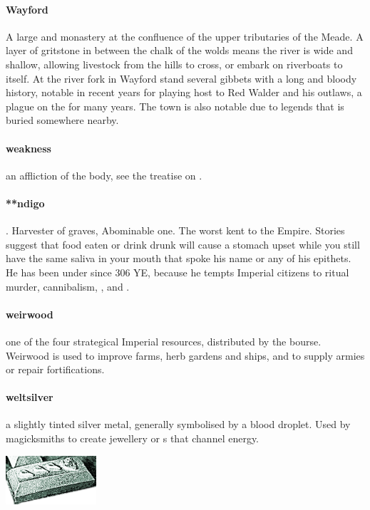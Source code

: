 \paragraph{Wayford} A large  and monastery at the confluence of the upper tributaries of the Meade. A layer of gritstone in between the chalk of the wolds means the river is wide and shallow, allowing livestock from the hills to cross, or embark on riverboats to  itself. At the river fork in Wayford stand several gibbets with a long and bloody history, notable in recent years for playing host to Red Walder and his outlaws, a plague on the  for many years. The town is also notable due to legends that  is buried somewhere nearby.
\paragraph{weakness} an affliction of the body, see the treatise on .
\paragraph{**ndigo}. Harvester of graves, Abominable one. The worst   kent to the Empire. Stories suggest that food eaten or drink drunk will cause a stomach upset while you still have the same saliva in your mouth that spoke his name or any of his epithets. He has been under  since 306 YE, because he tempts Imperial citizens to ritual murder, cannibalism, ,  and .
\paragraph{weirwood} one of the four strategical Imperial resources, distributed by the bourse. Weirwood is used to improve farms, herb gardens and ships, and to supply armies or repair fortifications.
\paragraph{weltsilver} a slightly tinted silver metal, generally symbolised by a blood droplet. Used by magicksmiths to create jewellery or s that channel energy.\begin{center}\includegraphics[width=3.36cm]{encyclopedia/Weltsilver}\end{center} 

